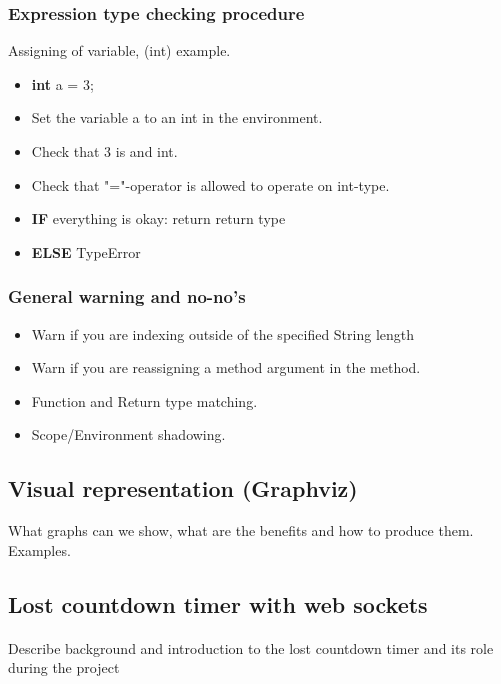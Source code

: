 \documentclass[paper=a4, fontsize=11pt]{article}
\numberwithin{equation}{section}	%
\numberwithin{figure}{section}		%
\numberwithin{table}{section}		%
\begin{document}
        \subsubsection{Expression type checking procedure}
            Assigning of variable, (int) example.
            \begin{itemize}
                	\item \textbf{int} a = 3;
                	\item Set the variable a to an int in the environment.
                	\item Check that 3 is and int.
                	\item Check that "="-operator is allowed to operate on int-type.
                	\item \textbf{IF} everything is okay: return return type
                	\item \textbf{ELSE} TypeError
            \end{itemize}

        \subsubsection{General warning and no-no's}
            \begin{itemize}
            	\item Warn if you are indexing outside of the specified String length
            	\item Warn if you are reassigning a method argument in the method.
            	\item Function and Return type matching.
            	\item Scope/Environment shadowing.
            \end{itemize}
    
    \subsection {Visual representation (Graphviz)}
        What graphs can we show, what are the benefits and how to produce them. Examples.
        
    \subsection {Lost countdown timer with web sockets}
        \paragraph{}
            Describe background and introduction to the lost countdown timer and its role during the project
        
\end{document}
